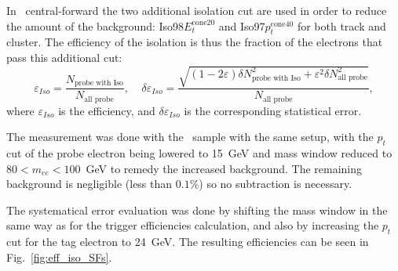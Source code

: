 In \Zee\ central-forward the two additional isolation cut are used in order to reduce the amount of the background: Iso98$E_{t}^{\mathrm{cone20}}$ and Iso97$p_{t}^{\mathrm{cone40}}$ for both track and cluster. The efficiency of the isolation is thus the fraction of the electrons that pass this additional cut:
\begin{equation}
\varepsilon_{Iso} = \frac{N_\text{probe with Iso} }{ N_\text{all probe} }, \;\;\;\;
\delta \varepsilon_{Iso} = \frac{\sqrt{(1-2\varepsilon) \delta N_\text{probe with Iso}^2 + \varepsilon^2 \delta N_\text{all probe}^2}}
                                {N_\text{all probe}},
\end{equation}
where $\varepsilon_{Iso}$ is the efficiency, and $\delta \varepsilon_{Iso}$ is the corresponding statistical error.

The measurement was done with the \Zee\ sample with the same setup, with the $p_{t}$ cut of the probe electron being lowered to 15~GeV and mass window reduced to $80 < m_{ee} < 100$~GeV to remedy the increased background. The remaining background is negligible (less than $0.1$\%) so no subtraction is necessary.

The systematical error evaluation was done by shifting the mass window in the same way as for the trigger efficiencies calculation, and also by increasing the $p_{t}$ cut for the tag electron to 24~GeV. The resulting efficiencies can be seen in Fig.~\ref{fig:eff_iso_SFs}.

\begin{figure}
\end{figure}
